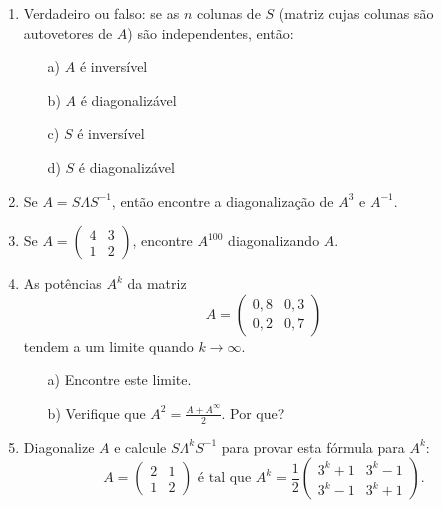\documentclass[12pt]{article}
\begin{document}
\begin{enumerate}
\item Verdadeiro ou falso: se as $n$ colunas de $S$ (matriz cujas colunas são autovetores de $A$) são independentes, então:
  \begin{itemize}
  \item[a)] $A$ é inversível
  \item[b)] $A$ é diagonalizável
  \item[c)] $S$ é inversível
  \item[d)] $S$ é diagonalizável
  \end{itemize}

\item Se $A=S\Lambda S^{-1}$, então encontre a diagonalização de $A^3$ e $A^{-1}$.

\item Se $A= \begin{pmatrix} 4 & 3\\ 1 & 2\end{pmatrix}$, encontre $A^{100}$ diagonalizando $A$.

\item As potências $A^k$ da matriz
    \begin{equation*}
      A = \begin{pmatrix}
        0,8 & 0,3\\
        0,2 & 0,7
      \end{pmatrix}
  \end{equation*}
  tendem a um limite quando $k\rightarrow \infty$. 
  \begin{itemize}
  \item[a)] Encontre este limite.
  \item[b)] Verifique que $A^2 = \frac{A+A^\infty}{2}$. Por que?
  \end{itemize}

\item Diagonalize $A$ e calcule $S\Lambda^k S^{-1}$ para provar esta fórmula para $A^k$:
  \begin{equation*}
    A = \begin{pmatrix}
        2 & 1\\
        1 & 2
      \end{pmatrix}
    \text{ é tal que } A^k = \frac{1}{2}
      \begin{pmatrix}
        3^k+1 & 3^k-1\\
        3^k-1 & 3^k+1
      \end{pmatrix}.
  \end{equation*}


\end{enumerate}
\end{document}
